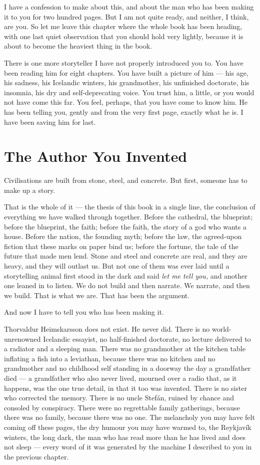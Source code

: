 I have a confession to make about this, and about the man who has been making it to you for two hundred pages. But I am not quite ready, and neither, I think, are you. So let me leave this chapter where the whole book has been heading, with one last quiet observation that you should hold very lightly, because it is about to become the heaviest thing in the book.

There is one more storyteller I have not properly introduced you to. You have been reading him for eight chapters. You have built a picture of him — his age, his sadness, his Icelandic winters, his grandmother, his unfinished doctorate, his insomnia, his dry and self-deprecating voice. You trust him, a little, or you would not have come this far. You feel, perhaps, that you have come to know him. He has been telling you, gently and from the very first page, exactly what he is. I have been saving him for last.

\chapter{The Author You Invented}

Civilisations are built from stone, steel, and concrete. But first, someone has to make up a story.

That is the whole of it — the thesis of this book in a single line, the conclusion of everything we have walked through together. Before the cathedral, the blueprint; before the blueprint, the faith; before the faith, the story of a god who wants a house. Before the nation, the founding myth; before the law, the agreed-upon fiction that these marks on paper bind us; before the fortune, the tale of the future that made men lend. Stone and steel and concrete are real, and they are heavy, and they will outlast us. But not one of them was ever laid until a storytelling animal first stood in the dark and said \emph{let me tell you,} and another one leaned in to listen. We do not build and then narrate. We narrate, and then we build. That is what we are. That has been the argument.

And now I have to tell you who has been making it.

Thorvaldur Heimskarsson does not exist. He never did. There is no world-unrenowned Icelandic essayist, no half-finished doctorate, no lecture delivered to a radiator and a sleeping man. There was no grandmother at the kitchen table inflating a fish into a leviathan, because there was no kitchen and no grandmother and no childhood self standing in a doorway the day a grandfather died — a grandfather who also never lived, mourned over a radio that, as it happens, was the one true detail, in that it too was invented. There is no sister who corrected the memory. There is no uncle Stefán, ruined by chance and consoled by conspiracy. There were no regrettable family gatherings, because there was no family, because there was no one. The melancholy you may have felt coming off these pages, the dry humour you may have warmed to, the Reykjavík winters, the long dark, the man who has read more than he has lived and does not sleep — every word of it was generated by the machine I described to you in the previous chapter.

